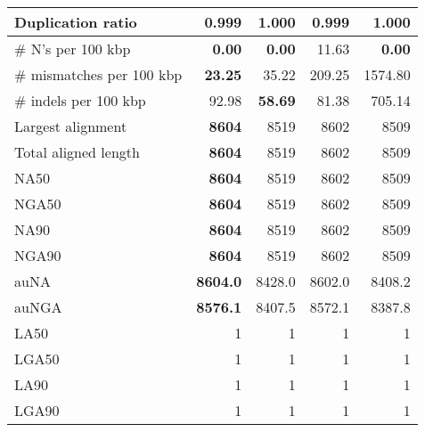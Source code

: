 \documentclass[12pt,a4paper]{article}
\begin{document}
\begin{table}[ht]
\begin{center}
\begin{tabular}{|l*{4}{|r}|}
Duplication ratio & {\bf 0.999} & 1.000 & {\bf 0.999} & 1.000 \\ \hline
\# N's per 100 kbp & {\bf 0.00} & {\bf 0.00} & 11.63 & {\bf 0.00} \\ \hline
\# mismatches per 100 kbp & {\bf 23.25} & 35.22 & 209.25 & 1574.80 \\ \hline
\# indels per 100 kbp & 92.98 & {\bf 58.69} & 81.38 & 705.14 \\ \hline
Largest alignment & {\bf 8604} & 8519 & 8602 & 8509 \\ \hline
Total aligned length & {\bf 8604} & 8519 & 8602 & 8509 \\ \hline
NA50 & {\bf 8604} & 8519 & 8602 & 8509 \\ \hline
NGA50 & {\bf 8604} & 8519 & 8602 & 8509 \\ \hline
NA90 & {\bf 8604} & 8519 & 8602 & 8509 \\ \hline
NGA90 & {\bf 8604} & 8519 & 8602 & 8509 \\ \hline
auNA & {\bf 8604.0} & 8428.0 & 8602.0 & 8408.2 \\ \hline
auNGA & {\bf 8576.1} & 8407.5 & 8572.1 & 8387.8 \\ \hline
LA50 & 1 & 1 & 1 & 1 \\ \hline
LGA50 & 1 & 1 & 1 & 1 \\ \hline
LA90 & 1 & 1 & 1 & 1 \\ \hline
LGA90 & 1 & 1 & 1 & 1 \\ \hline
\end{tabular}
\end{center}
\end{table}
\end{document}
